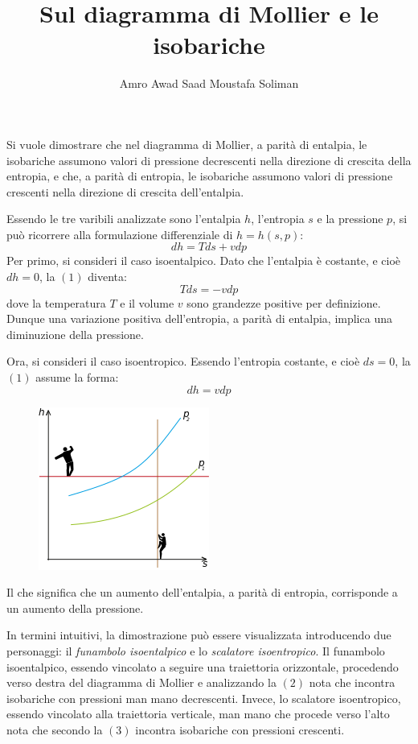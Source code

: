 \documentclass{article}
\title{Sul diagramma di Mollier e le isobariche}
\author{Amro Awad Saad Moustafa Soliman}
\begin{document}
\maketitle
Si vuole dimostrare che nel diagramma di Mollier, a parità di entalpia, le isobariche assumono valori di pressione decrescenti nella direzione di crescita della entropia, e che, a parità di entropia, le isobariche assumono valori di pressione crescenti nella direzione di crescita dell'entalpia.

Essendo le tre varibili analizzate sono l'entalpia $h$, l'entropia $s$ e la pressione $p$, si può ricorrere alla formulazione differenziale di $h=h(s,p)$:
\begin{equation}
  dh=Tds+vdp
\end{equation}
Per primo, si consideri il caso isoentalpico. Dato che l'entalpia è costante, e cioè $dh=0$, la $(1)$ diventa:
\begin{equation}
  Tds=-vdp
\end{equation}
dove la temperatura $T$ e il volume $v$ sono grandezze positive per definizione.
Dunque una variazione positiva dell'entropia, a parità di entalpia, implica una diminuzione della pressione.

Ora, si consideri il caso isoentropico. Essendo l'entropia costante, e cioè $ds=0$, la $(1)$ assume la forma:
\begin{equation}
  dh=vdp
\end{equation}
\begin{figure}[H]
  \centering
  \includegraphics[scale=0.85]{Grafico_di_Mollier.png}
\end{figure}
Il che significa che un aumento dell'entalpia, a parità di entropia, corrisponde a un aumento della pressione.

In termini intuitivi, la dimostrazione può essere visualizzata introducendo due personaggi: il \textit{funambolo isoentalpico} e lo \textit{scalatore isoentropico}.
Il funambolo isoentalpico, essendo vincolato a seguire una traiettoria orizzontale, procedendo verso destra del diagramma di Mollier e analizzando la $(2)$ nota che incontra isobariche con pressioni man mano decrescenti. Invece, lo scalatore isoentropico, essendo vincolato alla traiettoria verticale, man mano che procede verso l'alto nota che secondo la $(3)$ incontra isobariche con pressioni crescenti.
\end{document}
